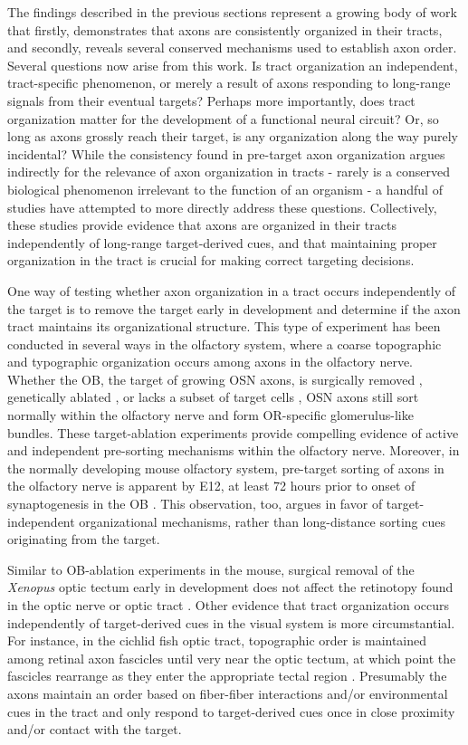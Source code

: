 \label{sec:TractOrderIndependOfTargeting}
The findings described in the previous sections represent a growing body of work that firstly, demonstrates that axons are consistently organized in their tracts, and secondly, reveals several conserved mechanisms used to establish axon order.
Several questions now arise from this work.
Is tract organization an independent, tract-specific phenomenon, or merely a result of axons responding to long-range signals from their eventual targets?
Perhaps more importantly, does tract organization matter for the development of a functional neural circuit?
Or, so long as axons grossly reach their target, is any organization along the way purely incidental?
While the consistency found in pre-target axon organization argues indirectly for the relevance of axon organization in tracts - rarely is a conserved biological phenomenon irrelevant to the function of an organism - a handful of studies have attempted to more directly address these questions.
Collectively, these studies provide evidence that axons are organized in their tracts independently of long-range target-derived cues, and that maintaining proper organization in the tract is crucial for making correct targeting decisions.

One way of testing whether axon organization in a tract occurs independently of the target is to remove the target early in development and determine if the axon tract maintains its organizational structure.
This type of experiment has been conducted in several ways in the olfactory system, where a coarse topographic and typographic organization occurs among axons in the olfactory nerve.
Whether the OB, the target of growing OSN axons, is surgically removed \cite{graziadei1978regeneration}, genetically ablated \cite{stjohn2003sorting}, or lacks a subset of target cells \cite{bulfone1998olfactory}, OSN axons still sort normally within the olfactory nerve and form OR-specific glomerulus-like bundles.
These target-ablation experiments provide compelling evidence of active and independent pre-sorting mechanisms within the olfactory nerve.
Moreover, in the normally developing mouse olfactory system, pre-target sorting of axons in the olfactory nerve is apparent by E12, at least 72 hours prior to onset of synaptogenesis in the OB \cite{miller2010axon}.
This observation, too, argues in favor of target-independent organizational mechanisms, rather than long-distance sorting cues originating from the target.

Similar to OB-ablation experiments in the mouse, surgical removal of the \emph{Xenopus} optic tectum early in development does not affect the retinotopy found in the optic nerve or optic tract \cite{reh1983organization}.
Other evidence that tract organization occurs independently of target-derived cues in the visual system is more circumstantial.
For instance, in the cichlid fish optic tract, topographic order is maintained among retinal axon fascicles until very near the optic tectum, at which point the fascicles rearrange as they enter the appropriate tectal region \cite{scholes1979nerve}.
Presumably the axons maintain an order based on fiber-fiber interactions and/or environmental cues in the tract and only respond to target-derived cues once in close proximity and/or contact with the target.

